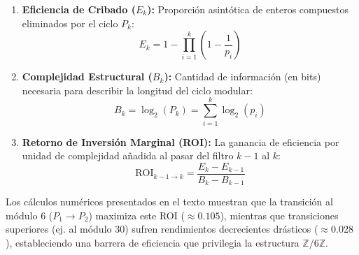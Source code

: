 \documentclass[12pt, a4paper]{article}
\theoremstyle{plain}
\theoremstyle{definition}
\newcommand{\Z}{\mathbb{Z}}
\begin{document}
\begin{enumerate}
    \item \textbf{Eficiencia de Cribado ($E_k$):} Proporción asintótica de enteros compuestos eliminados por el ciclo $P_k$:
    \[
    E_k = 1 - \prod_{i=1}^k \left(1 - \frac{1}{p_i}\right)
    \]
    
    \item \textbf{Complejidad Estructural ($B_k$):} Cantidad de información (en bits) necesaria para describir la longitud del ciclo modular:
    \[
    B_k = \log_2(P_k) = \sum_{i=1}^k \log_2(p_i)
    \]
    
    \item \textbf{Retorno de Inversión Marginal (ROI):} La ganancia de eficiencia por unidad de complejidad añadida al pasar del filtro $k-1$ al $k$:
    \[
    \text{ROI}_{k-1 \to k} = \frac{E_k - E_{k-1}}{B_k - B_{k-1}}
    \]
\end{enumerate}

Los cálculos numéricos presentados en el texto muestran que la transición al módulo 6 ($P_1 \to P_2$) maximiza este ROI ($\approx 0.105$), mientras que transiciones superiores (ej. al módulo 30) sufren rendimientos decrecientes drásticos ($\approx 0.028$), estableciendo una barrera de eficiencia que privilegia la estructura $\Z/6\Z$.
\end{document}
